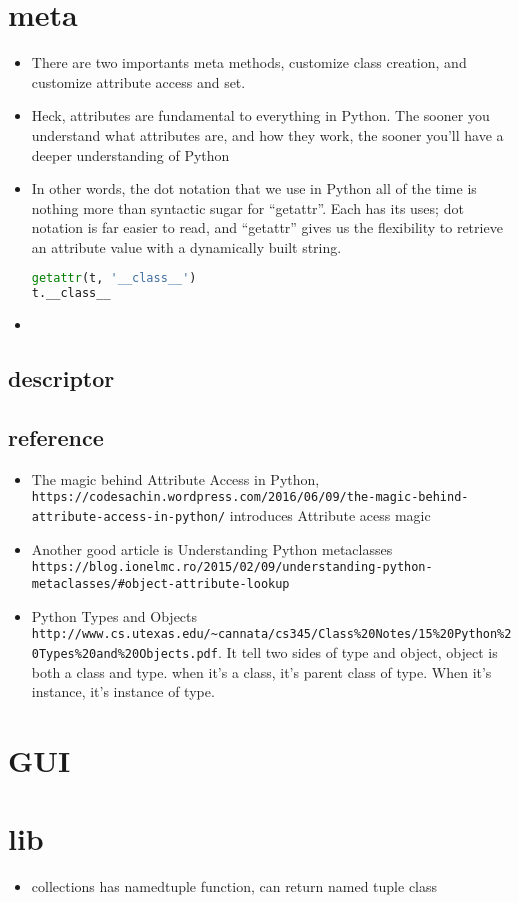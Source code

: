 \documentclass[a4paper,12pt,twoside]{book}
\begin{document}
\chapter{meta}
\begin{itemize}
	\item There are two importants meta methods, customize class creation, and customize attribute access and set. 
	\item Heck, attributes are fundamental to everything in Python. The sooner you understand what attributes are, and how they work, the sooner you’ll have a deeper understanding of Python
	\item In other words, the dot notation that we use in Python all of the time is nothing more than syntactic sugar for “getattr”. Each has its uses; dot notation is far easier to read, and “getattr” gives us the flexibility to retrieve an attribute value with a dynamically built string.
\begin{lstlisting}[frame=single, language=python]
getattr(t, '__class__')
t.__class__
\end{lstlisting} 
	\item 
	
\end{itemize}
\section{descriptor}
\section{reference}
\begin{itemize}
	\item The magic behind Attribute Access in Python, \verb|https://codesachin.wordpress.com/2016/06/09/the-magic-behind-attribute-access-in-python/|
	introduces Attribute acess magic
	\item Another good article is  Understanding Python metaclasses \verb|https://blog.ionelmc.ro/2015/02/09/understanding-python-metaclasses/#object-attribute-lookup|
	\item Python Types and Objects \verb|http://www.cs.utexas.edu/~cannata/cs345/Class%20Notes/15%20Python%20Types%20and%20Objects.pdf|. It tell two sides of type and object,  object is both a class and type. when it's a class, it's parent class of type. When it's instance, it's instance of type. 
\end{itemize}
\chapter{GUI}

\chapter{lib}
\begin{itemize}
	\item collections has namedtuple function, can return named tuple class
\end{itemize}




%
\end{document}
